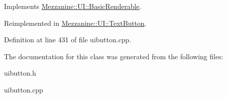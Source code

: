 Implements \hyperlink{classMezzanine_1_1UI_1_1BasicRenderable_a446b43c6dde21c7f0c021ca6833f841d}{Mezzanine::UI::BasicRenderable}.



Reimplemented in \hyperlink{classMezzanine_1_1UI_1_1TextButton_a06a5a6400dff268de5c91737de09fda9}{Mezzanine::UI::TextButton}.



Definition at line 431 of file uibutton.cpp.



The documentation for this class was generated from the following files:\begin{DoxyCompactItemize}
\item 
uibutton.h\item 
uibutton.cpp\end{DoxyCompactItemize}
